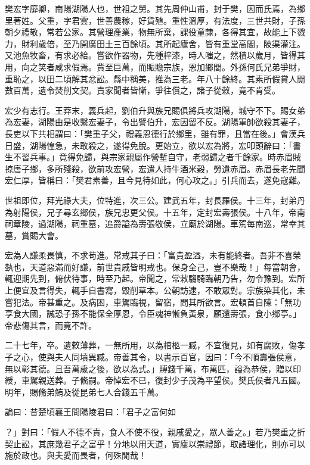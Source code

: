 
\begin{pinyinscope}
樊宏字靡卿，南陽湖陽人也，世祖之舅。其先周仲山甫，封于樊，因而氏焉，為鄉里著姓。父重，字君雲，世善農稼，好貨殖。重性溫厚，有法度，三世共財，子孫朝夕禮敬，常若公家。其營理產業，物無所棄，課役童隸，各得其宜，故能上下戮力，財利歲倍，至乃開廣田土三百餘頃。其所起廬舍，皆有重堂高閣，陂渠灌注。又池魚牧畜，有求必給。嘗欲作器物，先種梓漆，時人嗤之，然積以歲月，皆得其用，向之笑者咸求假焉。貲至巨萬，而賑贍宗族，恩加鄉閭。外孫何氏兄弟爭財，重恥之，以田二頃解其忿訟。縣中稱美，推為三老。年八十餘終。其素所假貸人閒數百萬，遺令焚削文契。責家聞者皆慚，爭往償之，諸子從敕，竟不肯受。

宏少有志行。王莽末，義兵起，劉伯升與族兄賜俱將兵攻湖陽，城守不下。賜女弟為宏妻，湖陽由是收繫宏妻子，令出譬伯升，宏因留不反。湖陽軍帥欲殺其妻子，長吏以下共相謂曰：「樊重子父，禮義恩德行於鄉里，雖有罪，且當在後。」會漢兵日盛，湖陽惶急，未敢殺之，遂得免脫。更始立，欲以宏為將，宏叩頭辭曰：「書生不習兵事。」竟得免歸，與宗家親屬作營塹自守，老弱歸之者千餘家。時赤眉賊掠唐子鄉，多所殘殺，欲前攻宏營，宏遣人持牛酒米穀，勞遺赤眉。赤眉長老先聞宏仁厚，皆稱曰：「樊君素善，且今見待如此，何心攻之。」引兵而去，遂免寇難。

世祖即位，拜光祿大夫，位特進，次三公。建武五年，封長羅侯。十三年，封弟丹為射陽侯，兄子尋玄鄉侯，族兄忠更父侯。十五年，定封宏壽張侯。十八年，帝南祠章陵，過湖陽，祠重墓，追爵謚為壽張敬侯，立廟於湖陽。車駕每南巡，常幸其墓，賞賜大會。

宏為人謙柔畏慎，不求苟進。常戒其子曰：「富貴盈溢，未有能終者。吾非不喜榮埶也，天道惡滿而好謙，前世貴戚皆明戒也。保身全己，豈不樂哉！」每當朝會，輒迎期先到，俯伏待事，時至乃起。帝聞之，常敕騶騎臨朝乃告，勿令豫到。宏所上便宜及言得失，輒手自書寫，毀削草本。公朝訪逮，不敢眾對。宗族染其化，未嘗犯法。帝甚重之。及病困，車駕臨視，留宿，問其所欲言。宏頓首自陳：「無功享食大國，誠恐子孫不能保全厚恩，令臣魂神慚負黃泉，願還壽張，食小鄉亭。」帝悲傷其言，而竟不許。

二十七年，卒。遺敕薄葬，一無所用，以為棺柩一臧，不宜復見，如有腐敗，傷孝子之心，使與夫人同墳異臧。帝善其令，以書示百官，因曰：「今不順壽張侯意，無以彰其德。且吾萬歲之後，欲以為式。」賻錢千萬，布萬匹，謚為恭侯，贈以印綬，車駕親送葬。子鯈嗣。帝悼宏不已，復封少子茂為平望侯。樊氏侯者凡五國。明年，賜鯈弟鮪及從昆弟七人合錢五千萬。

論曰：昔楚頃襄王問陽陵君曰：「君子之富何如

？」對曰：「假人不德不責，食人不使不役，親戚愛之，眾人善之。」若乃樊重之折契止訟，其庶幾君子之富乎！分地以用天道，實廩以崇禮節，取諸理化，則亦可以施於政也。與夫愛而畏者，何殊閒哉！


\end{pinyinscope}
